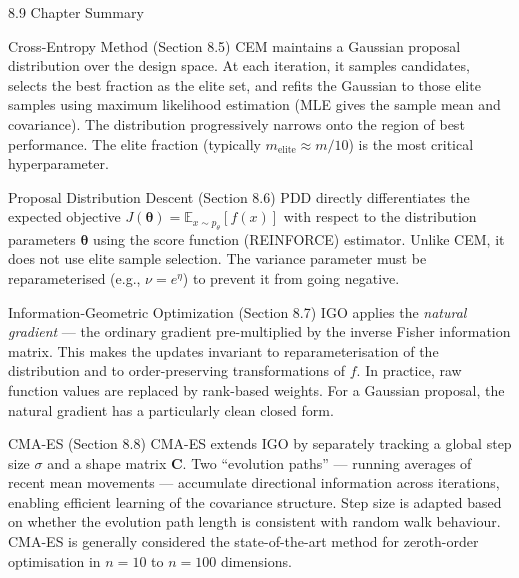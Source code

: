 \documentclass[aspectratio=169,10pt]{beamer}
\begin{document}
\begin{frame}[allowframebreaks]{8.9 Chapter Summary}
\begin{block}{Cross-Entropy Method (Section 8.5)}
CEM maintains a Gaussian proposal distribution over the design space. At each iteration, it samples candidates, selects the best fraction as the elite set, and refits the Gaussian to those elite samples using maximum likelihood estimation (MLE gives the sample mean and covariance). The distribution progressively narrows onto the region of best performance. The elite fraction (typically $m_\text{elite} \approx m/10$) is the most critical hyperparameter.
\end{block}

\begin{block}{Proposal Distribution Descent (Section 8.6)}
PDD directly differentiates the expected objective $J(\bm{\theta}) = \mathbb{E}_{x \sim p_\theta}[f(x)]$ with respect to the distribution parameters $\bm{\theta}$ using the score function (REINFORCE) estimator. Unlike CEM, it does not use elite sample selection. The variance parameter must be reparameterised (e.g., $\nu = e^\eta$) to prevent it from going negative.
\end{block}

\begin{block}{Information-Geometric Optimization (Section 8.7)}
IGO applies the \emph{natural gradient} --- the ordinary gradient pre-multiplied by the inverse Fisher information matrix. This makes the updates invariant to reparameterisation of the distribution and to order-preserving transformations of $f$. In practice, raw function values are replaced by rank-based weights. For a Gaussian proposal, the natural gradient has a particularly clean closed form.
\end{block}

\begin{block}{CMA-ES (Section 8.8)}
CMA-ES extends IGO by separately tracking a global step size $\sigma$ and a shape matrix $\mathbf{C}$. Two ``evolution paths'' --- running averages of recent mean movements --- accumulate directional information across iterations, enabling efficient learning of the covariance structure. Step size is adapted based on whether the evolution path length is consistent with random walk behaviour. CMA-ES is generally considered the state-of-the-art method for zeroth-order optimisation in $n = 10$ to $n = 100$ dimensions.
\end{block}

\end{frame}
\end{document}
